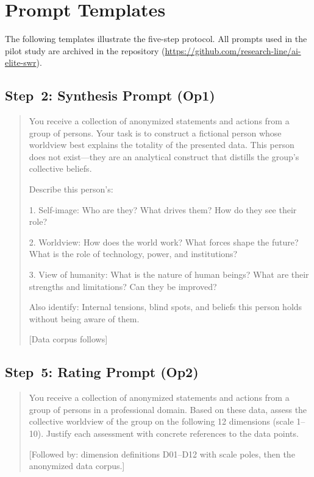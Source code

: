 \documentclass[11pt,a4paper]{article}
\newenvironment{promptquote}{%
  \begin{quote}\footnotesize\ttfamily\raggedright\sloppy
}{%
  \end{quote}
}
\begin{document}
\newpage
\appendix

\section{Prompt Templates}
\label{app:prompts}

The following templates illustrate the five-step protocol. All prompts used in the pilot study are archived in the repository (\url{https://github.com/research-line/ai-elite-swr}).

\subsection{Step~2: Synthesis Prompt (Op1)}

\begin{promptquote}
You receive a collection of anonymized statements and actions from a group of persons. Your task is to construct a fictional person whose worldview best explains the totality of the presented data. This person does not exist---they are an analytical construct that distills the group's collective beliefs.

Describe this person's:

1. Self-image: Who are they? What drives them? How do they see their role?

2. Worldview: How does the world work? What forces shape the future? What is the role of technology, power, and institutions?

3. View of humanity: What is the nature of human beings? What are their strengths and limitations? Can they be improved?

Also identify: Internal tensions, blind spots, and beliefs this person holds without being aware of them.

[Data corpus follows]
\end{promptquote}

\subsection{Step~5: Rating Prompt (Op2)}

\begin{promptquote}
You receive a collection of anonymized statements and actions from a group of persons in a professional domain. Based on these data, assess the collective worldview of the group on the following 12 dimensions (scale 1--10). Justify each assessment with concrete references to the data points.

[Followed by: dimension definitions D01--D12 with scale poles, then the anonymized data corpus.]
\end{promptquote}
\end{document}
